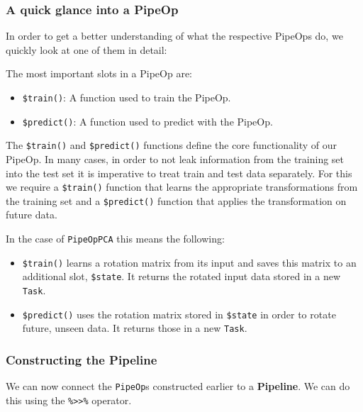 \documentclass[
]{scrbook}
\providecommand{\tightlist}{%
  \setlength{\itemsep}{0pt}\setlength{\parskip}{0pt}}
\begin{document}
\hypertarget{a-quick-glance-into-a-pipeop}{%
\subsubsection{A quick glance into a PipeOp}\label{a-quick-glance-into-a-pipeop}}

In order to get a better understanding of what the respective PipeOps do, we quickly look at one of them in detail:

The most important slots in a PipeOp are:

\begin{itemize}
\tightlist
\item
  \texttt{\$train()}: A function used to train the PipeOp.
\item
  \texttt{\$predict()}: A function used to predict with the PipeOp.
\end{itemize}

The \texttt{\$train()} and \texttt{\$predict()} functions define the core functionality of our PipeOp.
In many cases, in order to not leak information from the training set into the test set it is imperative to treat train and test data separately.
For this we require a \texttt{\$train()} function that learns the appropriate transformations from the training set and a \texttt{\$predict()} function that applies the transformation on future data.

In the case of \texttt{PipeOpPCA} this means the following:

\begin{itemize}
\tightlist
\item
  \texttt{\$train()} learns a rotation matrix from its input and saves this matrix to an additional slot, \texttt{\$state}.
  It returns the rotated input data stored in a new \texttt{Task}.
\item
  \texttt{\$predict()} uses the rotation matrix stored in \texttt{\$state} in order to rotate future, unseen data.
  It returns those in a new \texttt{Task}.
\end{itemize}

\hypertarget{constructing-the-pipeline}{%
\subsubsection{Constructing the Pipeline}\label{constructing-the-pipeline}}

We can now connect the \texttt{PipeOp}s constructed earlier to a \textbf{Pipeline}.
We can do this using the \texttt{\%\textgreater{}\textgreater{}\%} operator.
\end{document}

